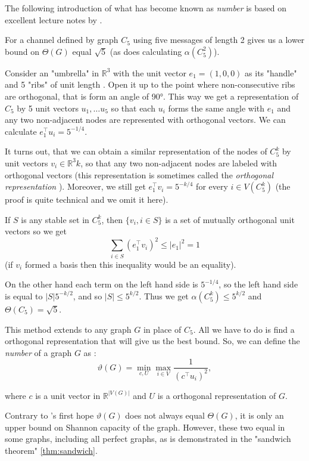 The following introduction of what has become known as \emph{\Lovasz number} is based on excellent lecture notes by \Lovasz \cite{Lovasz95}. 

For a channel defined by graph $C_5$ using five messages of length 2 gives us a lower bound on $\Theta(G)$ equal $\sqrt{5}$ (as does calculating $\alpha(C_5^2)$).

Consider an "umbrella" in $\mathbb{R}^3$ with the unit vector $e_1 = (1, 0, 0)$ as its "handle" and 5 "ribs" of unit length . Open it up to the point where non-consecutive ribs are orthogonal, that is form an angle of 90°. This way we get a representation of $C_5$ by 5 unit vectors $u_1, \ldots u_5$ so that each $u_i$ forms the same angle with $e_1$ and any two non-adjacent nodes are represented with orthogonal vectors. We can calculate $e_1^\intercal u_i = 5 ^ {-1/4}$.

It turns out, that we can obtain a similar representation of the nodes of $C_5^k$ by unit vectors $v_i \in \mathbb{R}^3k$, so that any two non-adjacent nodes are labeled with orthogonal vectors (this representation is sometimes called the \emph{orthogonal representation} \cite{Lovsz1989Orthogonal}). Moreover, we still get $e_1^\intercal v_i = 5^{-k/4}$ for every $i \in V(C_5^k)$ (the proof is quite technical and we omit it here).

If $S$ is any stable set in $C_5^k$, then $\{v_i, i \in S\}$ is a set of mutually orthogonal unit vectors so we get 
$$\sum\limits_{i\in S}(e_1^\intercal v_i)^2 \leq |e_1|^2 = 1$$ 
(if $v_i$ formed a basis then this inequality would be an equality).

On the other hand each term on the left hand side is $5^{-1/4}$, so the left hand side is equal to $|S|5^{-k/2}$, and so $|S| \leq 5^{k/2}$. Thus we get $\alpha(C_5^k) \leq 5 ^{k/2}$ and $\Theta(C_5) = \sqrt{5}$.

This method extends to any graph $G$ in place of $C_5$. All we have to do is find a orthogonal representation that will give us the best bound. So, we can define the \emph{\Lovasz number} of a graph $G$ as : 
$$\vartheta(G) = \min\limits_{c,U} \max\limits_{i\in V} \frac{1}{(c^\intercal u_i)^2},$$

where $c$ is a unit vector in $\mathbb{R}^{|V(G)|}$ and $U$ is a orthogonal representation of $G$. 

Contrary to \Lovasz's first hope \cite{Lovasz1979} $\vartheta(G)$ does not always equal $\Theta(G)$, it is only an upper bound on Shannon capacity of the graph. However, these two equal in some graphs, including all perfect graphs, as is demonstrated in the \Lovasz "sandwich theorem" \cref{thm:sandwich}.

